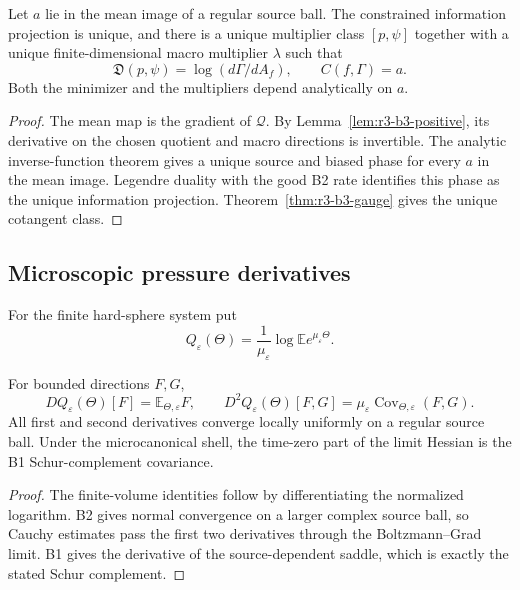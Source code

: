 \begin{theorem}
\label{thm:r3-b3-multiplier}
Let \(a\) lie in the mean image of a regular source ball.  The constrained
information projection is unique, and there is a unique multiplier class
\([p,\psi]\) together with a unique finite-dimensional macro multiplier
\(\lambda\) such that
\[
 \mathfrak D(p,\psi)=\log(d\Gamma/dA_f),
 \qquad C(f,\Gamma)=a.
\]
Both the minimizer and the multipliers depend analytically on \(a\).
\end{theorem}

\begin{proof}
The mean map is the gradient of \(\mathcal Q\).  By
Lemma~\ref{lem:r3-b3-positive}, its derivative on the chosen quotient and
macro directions is invertible.  The analytic inverse-function theorem gives
a unique source and biased phase for every \(a\) in the mean image.  Legendre
duality with the good B2 rate identifies this phase as the unique information
projection.  Theorem~\ref{thm:r3-b3-gauge} gives the unique cotangent class.
\end{proof}

\subsection{Microscopic pressure derivatives}

For the finite hard-sphere system put
\[
 Q_\varepsilon(\Theta)
 =\frac1{\mu_\varepsilon}
 \log\mathbb E e^{\mu_\varepsilon\Theta}.
\]

\begin{proposition}
\label{prop:r3-b3-normalization}
For bounded directions \(F,G\),
\[
 DQ_\varepsilon(\Theta)[F]
 =\mathbb E_{\Theta,\varepsilon}F,
 \qquad
 D^2Q_\varepsilon(\Theta)[F,G]
 =\mu_\varepsilon
 \operatorname{Cov}_{\Theta,\varepsilon}(F,G).
\]
All first and second derivatives converge locally uniformly on a regular
source ball.  Under the microcanonical shell, the time-zero part of the limit
Hessian is the B1 Schur-complement covariance.
\end{proposition}

\begin{proof}
The finite-volume identities follow by differentiating the normalized
logarithm.  B2 gives normal convergence on a larger complex source ball, so
Cauchy estimates pass the first two derivatives through the
Boltzmann--Grad limit.  B1 gives the derivative of the source-dependent saddle,
which is exactly the stated Schur complement.
\end{proof}

